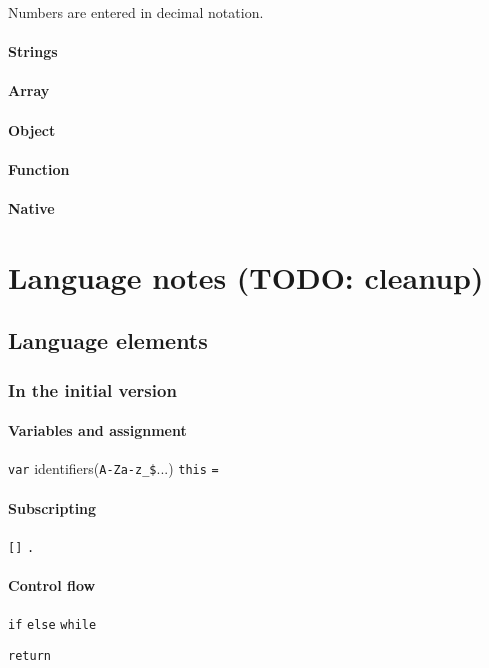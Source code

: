 Numbers are entered in decimal notation.

\subsubsection{Strings}

\subsubsection{Array}
\subsubsection{Object}
\subsubsection{Function}
\subsubsection{Native}


\chapter{Language notes (TODO: cleanup)}
\section{Language elements}

\subsection{In the initial version}

\subsubsection{Variables and assignment}
\verb|var|
identifiers(\verb|A-Za-z_$|...)
\verb|this|
\verb|=|

\subsubsection{Subscripting}
\verb|[]|
\verb|.|

\subsubsection{Control flow}
\verb|if| \verb|else| \verb|while|

\verb|return|

